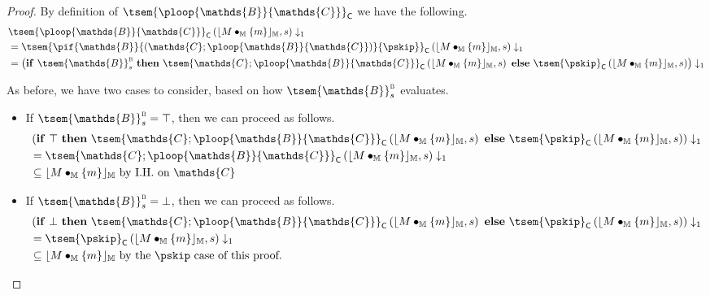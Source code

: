 {\begin{proof}
By definition of $\tsem{\ploop{\mathds{B}}{\mathds{C}}}_\mathsf{C}$ we have the following.
\begin{align*}
	&\tsem{\ploop{\mathds{B}}{\mathds{C}}}_\mathsf{C} \left( \lfloor M \bullet_\mathbb{M} \{m\} \rfloor_\mathbb{M}, s \right) \downarrow_1
	\\
	&=
	\tsem{\pif{\mathds{B}}{\left(\mathds{C};\ploop{\mathds{B}}{\mathds{C}}\right)}{\pskip}}_\mathsf{C} \left( \lfloor M \bullet_\mathbb{M} \{m\} \rfloor_\mathbb{M}, s \right) \downarrow_1 \\
	&=
	\left( \mathbf{if}\ \tsem{\mathds{B}}^\textsc{b}_s\ \mathbf{then}\ \tsem{\mathds{C};\ploop{\mathds{B}}{\mathds{C}}}_\mathsf{C}\left( \lfloor M \bullet_\mathbb{M} \{m\} \rfloor_\mathbb{M}, s \right)\ \mathbf{else}\ \tsem{\pskip}_\mathsf{C}\left( \lfloor M \bullet_\mathbb{M} \{m\} \rfloor_\mathbb{M}, s \right) \right) \downarrow_1
\end{align*}

As before, we have two cases to consider, based on how $\tsem{\mathds{B}}_s^\textsc{b}$ evaluates.
\begin{itemize}
	\item If $\tsem{\mathds{B}}_s^\textsc{b} = \top$, then we can proceed as follows.
		\begin{align*}
			&\left( \mathbf{if}\ \top\ \mathbf{then}\ \tsem{\mathds{C};\ploop{\mathds{B}}{\mathds{C}}}_\mathsf{C}\left( \lfloor M \bullet_\mathbb{M} \{m\} \rfloor_\mathbb{M}, s \right)\ \mathbf{else}\ \tsem{\pskip}_\mathsf{C}\left( \lfloor M \bullet_\mathbb{M} \{m\} \rfloor_\mathbb{M}, s \right) \right) \downarrow_1
			\\
			&= \tsem{\mathds{C};\ploop{\mathds{B}}{\mathds{C}}}_\mathsf{C}\left( \lfloor M \bullet_\mathbb{M} \{m\} \rfloor_\mathbb{M}, s \right) \downarrow_1
			\\
			& \subseteq \lfloor M \bullet_\mathbb{M} \{m\} \rfloor_\mathbb{M} \text{ by I.H. on } \mathds{C}
		\end{align*}
	\item If $\tsem{\mathds{B}}_s^\textsc{b} = \bot$, then we can proceed as follows.
		\begin{align*}
			&\left( \mathbf{if}\ \bot\ \mathbf{then}\ \tsem{\mathds{C};\ploop{\mathds{B}}{\mathds{C}}}_\mathsf{C}\left( \lfloor M \bullet_\mathbb{M} \{m\} \rfloor_\mathbb{M}, s \right)\ \mathbf{else}\ \tsem{\pskip}_\mathsf{C}\left( \lfloor M \bullet_\mathbb{M} \{m\} \rfloor_\mathbb{M}, s \right) \right) \downarrow_1
			\\
			&= \tsem{\pskip}_\mathsf{C}\left( \lfloor M \bullet_\mathbb{M} \{m\} \rfloor_\mathbb{M}, s \right) \downarrow_1
			\\
			& \subseteq \lfloor M \bullet_\mathbb{M} \{m\} \rfloor_\mathbb{M} \text{ by the } \pskip \text{ case of this proof}.
		\end{align*}
\end{itemize}
\end{proof}
}

